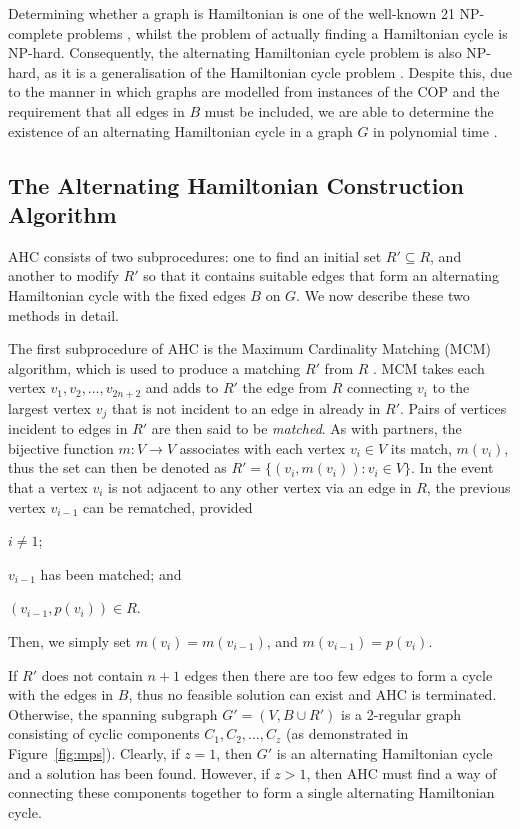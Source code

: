 \documentclass[authoryear]{elsarticle}
\begin{document}
Determining whether a graph is Hamiltonian is one of the well-known 21 NP-complete problems \cite{karp1972}, whilst the problem of actually finding a Hamiltonian cycle is NP-hard. Consequently, the alternating Hamiltonian cycle problem is also NP-hard, as it is a generalisation of the Hamiltonian cycle problem \citep{haggkvist1977}. Despite this, due to the manner in which graphs are modelled from instances of the COP and the requirement that all edges in $B$ must be included, we are able to determine the existence of an alternating Hamiltonian cycle in a graph $G$ in polynomial time \citep{hawa2018}.

\subsection{The Alternating Hamiltonian Construction Algorithm}
\label{sub:ahc}

\noindent AHC consists of two subprocedures: one to find an initial set $R' \subseteq R$, and another to modify $R'$ so that it contains suitable edges that form an alternating Hamiltonian cycle with the fixed edges $B$ on $G$. We now describe these two methods in detail.

The first subprocedure of AHC is the Maximum Cardinality Matching (MCM) algorithm, which is used to produce a matching $R'$ from $R$ \citep{mahadev1994}. MCM takes each vertex $v_1, v_2,\dotsc,v_{2n+2}$ and adds to $R'$ the edge from $R$ connecting $v_i$ to the largest vertex $v_j$ that is not incident to an edge in already in $R'$. Pairs of vertices incident to edges in $R'$ are then said to be \emph{matched}. As with partners, the bijective function $m : V \to V$ associates with each vertex $v_i \in V$ its match, $m(v_i)$, thus the set can then be denoted as $R' = \{(v_i, m(v_i)): v_i \in V\}$. In the event that a vertex $v_i$ is not adjacent to any other vertex via an edge in $R$, the previous vertex $v_{i-1}$ can be rematched, provided 
\begin{enumerate*}[label={(\alph*)}]
	\item $i \neq 1$;
	\item $v_{i-1}$ has been matched; and
	\item $(v_{i-1}, p(v_i)) \in R$.
\end{enumerate*} 
Then, we simply set $m(v_i) = m(v_{i-1})$, and $m(v_{i-1}) = p(v_i)$.

If $R'$ does not contain $n+1$ edges then there are too few edges to form a cycle with the edges in $B$, thus no feasible solution can exist and AHC is terminated. Otherwise, the spanning subgraph $G'=(V, B \cup R')$ is a 2-regular graph consisting of cyclic components $C_1,C_2,\dotsc,C_z$ (as demonstrated in Figure~\ref{fig:mps}). Clearly, if $z = 1$, then $G'$ is an alternating Hamiltonian cycle and a solution has been found. However, if $z > 1$, then AHC must find a way of connecting these components together to form a single alternating Hamiltonian cycle.
\end{document}

